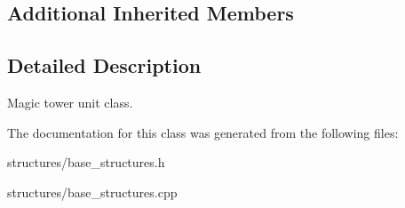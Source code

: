 \subsection*{Additional Inherited Members}


\subsection{Detailed Description}
Magic tower unit class. 

The documentation for this class was generated from the following files\+:\begin{DoxyCompactItemize}
\item 
structures/base\+\_\+structures.\+h\item 
structures/base\+\_\+structures.\+cpp\end{DoxyCompactItemize}
